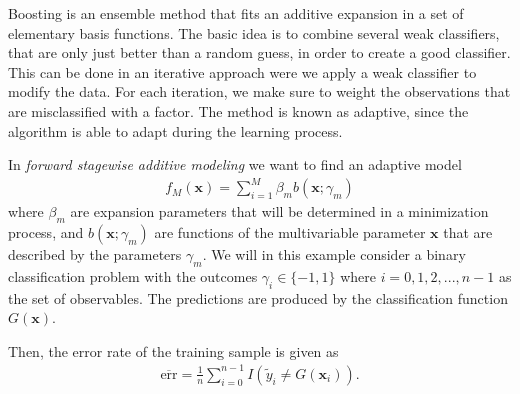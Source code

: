 Boosting is an ensemble method that fits an additive expansion in a set of elementary basis functions. The basic idea is to combine several weak classifiers, that are only just better than a random guess, in order to create a good classifier. This can be done in an iterative approach were we apply a weak classifier to modify the data. For each iteration, we make sure to weight the observations that are misclassified with a factor. The method is known as adaptive, since the algorithm is able to adapt during the learning process.

In \textit{forward stagewise additive modeling} we want to find an adaptive model
\begin{align}
  f_M (\textbf{x}) = \sum_{i=1}^M \beta_m b(\textbf{x}; \gamma_m)
\end{align}
where $\beta_m$ are expansion parameters that will be determined in a minimization process, and $b(\textbf{x};\gamma_m)$ are functions of the multivariable parameter $\textbf{x}$ that are described by the parameters $\gamma_m$. We will in this example consider a binary classification problem with the outcomes $\gamma_i \in \{-1,1\}$ where $i=0,1,2,...,n-1$ as the set of observables. The predictions are produced by the classification function $G(\textbf{x})$.

Then, the error rate of the training sample is given as
\begin{align}
  \overline{\text{err}} = \frac{1}{n} \sum_{i=0}^{n-1} I(\tilde{y}_i \neq G(\textbf{x}_i)).
\end{align}

